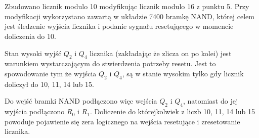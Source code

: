 \section{}
Zbudowano licznik modulo 10 modyfikując licznik modulo 16 z punktu 5.
Przy modyfikacji wykorzystano zawartą w układzie 7400 bramkę NAND, której celem jest śledzenie wyjścia licznika i podanie sygnału resetującego w momencie doliczenia do 10.

Stan wysoki wyjść \(Q_2\) i \(Q_4\) licznika (zakładając że zlicza on po kolei) jest warunkiem wystarczającym do stwierdzenia potrzeby resetu.
Jest to spowodowanie tym że wyjścia \(Q_2\) i \(Q_4\), są w stanie wysokim tylko gdy licznik doliczył do 10, 11, 14 lub 15.

Do wejść bramki NAND podłączono więc wejścia \(Q_2\) i \(Q_4\), natomiast do jej wyjścia podłączono \(R_0\) i \(R_1\).
Doliczenie do którejkolwiek z liczb 10, 11, 14 lub 15 powoduje pojawienie się zera logicznego na wejścia resetujące i zresetowanie licznika.
